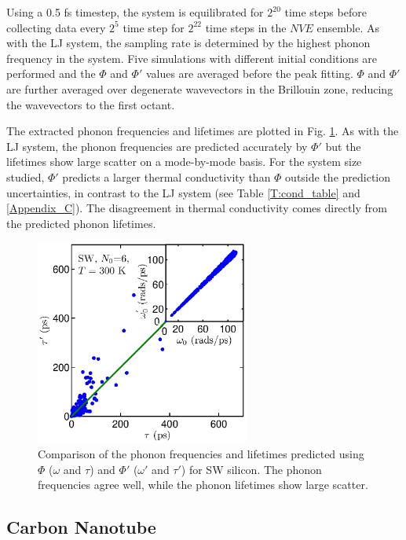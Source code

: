 \documentclass[12pt,twocolumn,iop]{/usr/share/texmf-texlive/tex/latex/iop/iopart}[/usr/share/texmf-texlive/tex/latex/iop/]
\begin{document}
Using a 0.5 fs timestep, the system is equilibrated for $2^{20}$ time steps before collecting data every $2^5$ time step for $2^{22}$ time steps in the $NVE$ ensemble.\cite{mcquarrie2000} As with the LJ system, the sampling rate is determined by the highest phonon frequency in the system. Five simulations with different initial conditions are performed and the $\Phi$ and $\Phi'$ values are averaged before the peak fitting. $\Phi$ and $\Phi'$ are further averaged over degenerate wavevectors in the Brillouin zone, reducing the wavevectors to the first octant.\cite{mcgaugheythesis}

The extracted phonon frequencies and lifetimes are plotted in Fig$.$ \ref{F:FREQ_LIFE_Si}. As with the LJ system, the phonon frequencies are predicted accurately by $\Phi'$ but the lifetimes show large scatter on a mode-by-mode basis. For the system size studied, $\Phi'$ predicts a larger thermal conductivity than $\Phi$ outside the prediction uncertainties, in contrast to the LJ system (see Table \ref{T:cond_table} and \ref{Appendix_C}). The disagreement in thermal conductivity comes directly from the predicted phonon lifetimes.

\begin{figure}
\begin{center}
\includegraphics[angle=0,width=70.0mm]{figure4.eps}
\vspace*{0mm}
\end{center}
\caption{\label{F:FREQ_LIFE_Si} Comparison of the phonon frequencies and lifetimes predicted using $\Phi$ ($\omega$ and $\tau$) and  $\Phi'$ ($\omega'$ and $\tau'$) for SW silicon. The phonon frequencies agree well, while the phonon lifetimes show large scatter.}
\end{figure}


\subsection{\label{S:Subsection_prop_CNT}Carbon Nanotube}
\end{document}
